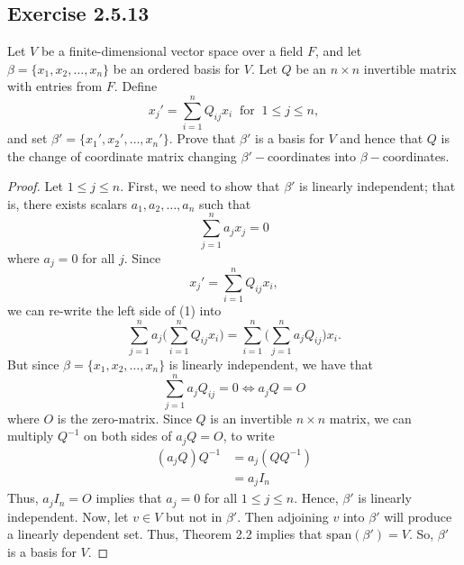 \subsection*{Exercise 2.5.13} Let \( V  \) be a finite-dimensional vector space over a field \( F  \), and let \( \beta = \{ {x}_{1}, {x}_{2}, \dots, {x}_{n} \}  \) be an ordered basis for \( V  \). Let \( Q  \) be an \( n \times n \) invertible matrix with entries from \( F  \). Define 
\[  {x}_{j}' = \sum_{ i=1  }^{ n  } {Q}_{ij} {x}_{i} \ \text{ for } \ 1 \leq j \leq n, \]
and set \( \beta' = \{ {x}_{1}', {x}_{2}', \dots, {x}_{n}' \}  \). Prove that \( \beta'  \) is a basis for \( V  \) and hence that \( Q  \) is the change of coordinate matrix changing \( \beta'-  \)coordinates into \( \beta- \)coordinates.
\begin{proof}
Let \( 1 \leq j \leq n \). First, we need to show that \( \beta'  \) is linearly independent; that is, there exists scalars \( {a}_{1}, {a}_{2}, \dots, {a}_{n}  \) such that
\[  \sum_{ j=1  }^{ n } {a}_{j} {x}_{j} = 0 \tag{1}  \]
    where \( {a}_{j} = 0   \) for all \( j\).
Since   
\[  {x}_{j}' = \sum_{ i=1 }^{ n } {Q}_{ij} {x}_{i}, \]
we can re-write the left side of (1) into
\[  \sum_{ j=1  }^{ n } {a}_{j} \Big( \sum_{ i=1 }^{ n } {Q}_{ij} {x}_{i} \Big) = \sum_{ i=1  }^{ n } \Big( \sum_{ j=1 }^{ n } {a}_{j} {Q}_{ij} \Big) {x}_{i}.   \]
But since \( \beta = \{ {x}_{1}, {x}_{2}, \dots, {x}_{n} \}   \) is linearly independent, we have that
\[  \sum_{ j=1  }^{ n } {a}_{j} {Q}_{ij} = 0 \iff {a}_{j} Q = O \]
where \( O  \) is the zero-matrix. Since \( Q  \) is an invertible \( n \times n  \) matrix, we can multiply \( Q^{-1} \) on both sides of \( {a}_{j} Q = O  \), to write
\begin{align*}
    ({a}_{j}Q) Q^{-1} &= {a}_{j} (Q Q^{-1}) \\
                      &= {a}_{j} {I}_{n}
\end{align*}
Thus, \( {a}_{j} {I}_{n} = O  \) implies that \( {a}_{j} = 0  \) for all \( 1 \leq j \leq n \). Hence, \( \beta'  \) is linearly independent. Now, let \( v \in V   \) but not in \( \beta'  \). Then adjoining \( v  \) into \( \beta'  \) will produce a linearly dependent set. Thus, Theorem 2.2 implies that \( \text{span}(\beta') = V  \). So, \( \beta'  \) is a basis for \( V  \).
\end{proof}

